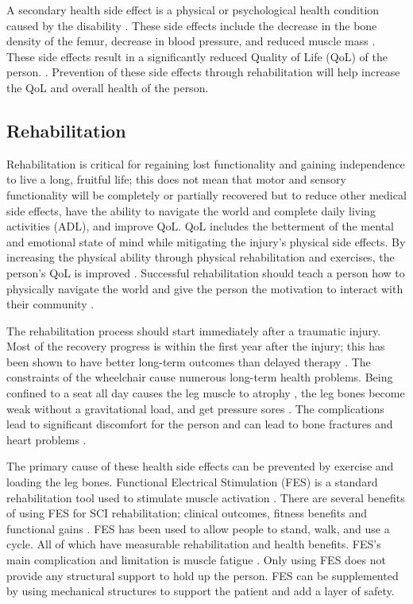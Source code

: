 A secondary health side effect is a physical or psychological health condition caused by the disability \cite{jensen2012secondary}.  These side effects include the decrease in the bone density of the femur, decrease in blood pressure, and reduced muscle mass \cite{haisma2007complications} \cite{hitzig2010understanding}. These side effects result in a significantly reduced Quality of Life (QoL) of the person.  	\cite{craven2012impact}. Prevention of these side effects through rehabilitation will help increase the QoL and overall health of the person.  



\subsection{Rehabilitation}
\label{sec:rehab}

 Rehabilitation is critical for regaining lost functionality and gaining independence to live a long, fruitful life; this does not mean that motor and sensory functionality will be completely or partially recovered but to reduce other medical side effects, have the ability to navigate the world and complete daily living activities (ADL), and improve QoL. QoL includes the betterment of the mental and emotional state of mind while mitigating the injury's physical side effects. By increasing the physical ability through physical rehabilitation and exercises, the person's QoL is improved \cite{noreau1995spinal}. Successful rehabilitation should teach a person how to physically navigate the world and give the person the motivation to interact with their community \cite{hammell2013spinal}.
 
 
 The rehabilitation process should start immediately after a traumatic injury. Most of the recovery progress is within the first year after the injury; this has been shown to have better long-term outcomes than delayed therapy \cite{scivoletto2005early} \cite{piepmeier1988late}.  The constraints of the wheelchair cause numerous long-term health problems. Being confined to a seat all day causes the leg muscle to atrophy \cite{castro1999influence}, the leg bones become weak \cite{goemaere1994bone} without a gravitational load, and get pressure sores \cite{wall2000preventing}. The complications lead to significant discomfort for the person and can lead to bone fractures and heart problems \cite{giangregorio2006bone}.  
 
 The primary cause of these health side effects can be prevented by exercise and loading the leg bones. Functional Electrical Stimulation (FES) is a standard rehabilitation tool used to stimulate muscle activation  \cite{quintero2012preliminary}. There are several benefits of using FES for SCI rehabilitation; clinical outcomes, fitness benefits and functional gains \cite{hamid2008role}. FES has been used to allow people to stand, walk, and use a cycle\cite{mazzoleni2013fes}. All of which have measurable rehabilitation and health benefits. FES's main complication and limitation is muscle fatigue \cite{karu1995reducing}. Only using FES  does not provide any structural support to hold up the person. FES can be supplemented by using mechanical structures to support the patient and add a layer of safety. 
 
